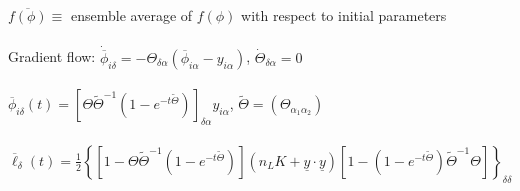 \documentclass{article}
\begin{document}
\\
\\
$\overline{f(\phi)} \equiv$ ensemble average of $f(\phi)$ with respect to initial parameters
\\
\\
Gradient flow: $\dot{\overline{\phi}}_{i\delta} = - \Theta_{\delta \alpha}(\overline{\phi}_{i\alpha}-y_{i\alpha})$, $\dot{\Theta}_{\delta\alpha}=0$
\\
\\
$\overline{\phi}_{i\delta}(t)=\left[ \Theta \tilde{\Theta}^{-1} (1-e^{-t \tilde{\Theta}}) \right]_{\delta\alpha} y_{i\alpha} $, $\tilde{\Theta}=(\Theta_{\alpha_1 \alpha_2})$
\\
\\
$\overline{\ell}_\delta (t) = \frac{1}{2}\left\{\left[1- \Theta \tilde{\Theta}^{-1} (1-e^{-t \tilde{\Theta}}) \right] (n_L K + \underline{y}\cdot \underline{y})
\left[1-(1-e^{-t \tilde{\Theta}})\tilde{\Theta}^{-1}\Theta\right] \right\}_{\delta\delta} $
\end{document}
